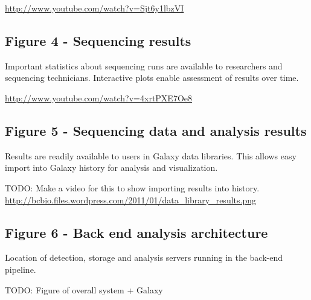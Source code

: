 \documentclass[10pt]{bmc_article}
\newenvironment{bmcformat}{\begin{raggedright}\baselineskip20pt\sloppy\setboolean{publ}{false}}{\end{raggedright}\baselineskip20pt\sloppy}
\begin{document}
\begin{bmcformat}
\url{http://www.youtube.com/watch?v=Sjt6y1lbzVI}

\subsection*{Figure 4 - Sequencing results}
Important statistics about sequencing runs are available to
researchers and sequencing technicians. Interactive plots enable
assessment of results over time.

\url{http://www.youtube.com/watch?v=4xrtPXE7Oe8}

\subsection*{Figure 5 - Sequencing data and analysis results}
Results are readily available to users in Galaxy data libraries. This
allows easy import into Galaxy history for analysis and visualization.

TODO: Make a video for this to show importing results into
history.
\url{http://bcbio.files.wordpress.com/2011/01/data_library_results.png}

\subsection*{Figure 6 - Back end analysis architecture}
Location of detection, storage and analysis servers running in the
back-end pipeline.

TODO: Figure of overall system + Galaxy
\end{bmcformat}
\end{document}
